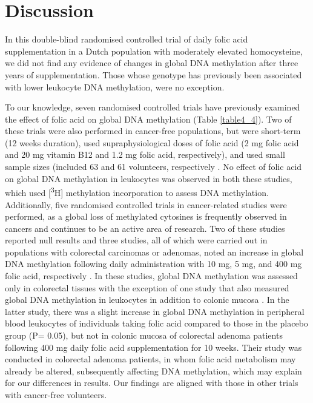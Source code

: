 \section{Discussion} %
\noindent In this double-blind randomised controlled trial of daily folic acid supplementation in a Dutch population with moderately elevated homocysteine, we did not find any evidence of changes in global DNA methylation after three years of supplementation. Those whose genotype has previously been associated with lower leukocyte DNA methylation, were no exception. 
 
\noindent To our knowledge, seven randomised controlled trials have previously examined the effect of folic acid on global DNA methylation (Table \ref{table4_4}). Two of these trials were also performed in cancer-free populations, but were short-term (12 weeks duration), used supraphysiological doses of folic acid (2 mg folic acid and 20 mg vitamin B12 and 1.2 mg folic acid, respectively), and used small sample sizes (included 63 and 61 volunteers, respectively \cite{c434,c435}. No effect of folic acid on global DNA methylation in leukocytes was observed in both these studies, which used [\textsuperscript{3}H] methylation incorporation to assess DNA methylation. Additionally, five randomised controlled trials in cancer-related studies were performed, as a global loss of methylated cytosines is frequently observed in cancers \cite{c436} and continues to be an active area of research. Two of these studies reported null results \cite{c437,c438} and three studies, all of which were carried out in populations with colorectal carcinomas or adenomas, noted an increase in global DNA methylation following daily administration with 10 mg, 5 mg, and 400 mg folic acid, respectively \cite{c439,c440,c441}. In these studies, global DNA methylation was assessed only in colorectal tissues with the exception of one study that also measured global DNA methylation in leukocytes in addition to colonic mucosa \cite{c441}. In the latter study, there was a slight increase in global DNA methylation in peripheral blood leukocytes of individuals taking folic acid compared to those in the placebo group (P= 0.05), but not in colonic mucosa of colorectal adenoma patients following 400 mg daily folic acid supplementation for 10 weeks. Their study was conducted in colorectal adenoma patients, in whom folic acid metabolism may already be altered, subsequently affecting DNA methylation, which may explain for our differences in results. Our findings are aligned with those in other trials with cancer-free volunteers.

